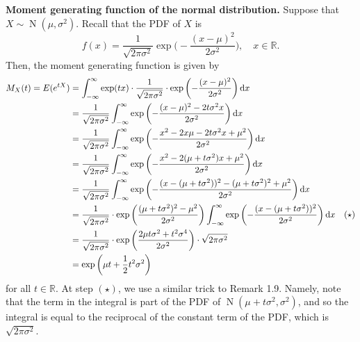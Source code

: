 \documentclass[10pt]{article}
\newcommand{\R}{\mathbb{R}}
\DeclareMathOperator{\Nor}{N}
\theoremstyle{newstyle}
\begin{document}
{\bf Moment generating function of the normal distribution.} Suppose that 
$X \sim \Nor(\mu, \sigma^2)$. Recall that the PDF of $X$ is 
\[ f(x) = \frac{1}{\sqrt{2\pi\sigma^2}} \exp \Big(-\frac{(x-\mu)^2}{2\sigma^2} \Big), 
\quad x \in \R. \]
Then, the moment generating function is given by 
\begin{align*}
    M_X(t) = E(e^{tX}) 
    &= \int_{-\infty}^\infty \exp(tx) \cdot \frac{1}{\sqrt{2\pi\sigma^2}} \cdot 
    \exp \left( -\frac{(x-\mu)^2}{2\sigma^2} \right) {\rm d}x \\
    &= \frac{1}{\sqrt{2\pi\sigma^2}} \int_{-\infty}^\infty  
    \exp \left( -\frac{(x-\mu)^2 - 2t\sigma^2 x}{2\sigma^2} \right) {\rm d}x \\
    &= \frac{1}{\sqrt{2\pi\sigma^2}} \int_{-\infty}^\infty  
    \exp \left( -\frac{x^2 - 2x\mu - 2t\sigma^2 x + \mu^2}{2\sigma^2} \right) {\rm d}x \\
    &= \frac{1}{\sqrt{2\pi\sigma^2}} \int_{-\infty}^\infty  
    \exp \left( -\frac{x^2 - 2(\mu + t\sigma^2)x + \mu^2}{2\sigma^2} \right) {\rm d}x \\
    &= \frac{1}{\sqrt{2\pi\sigma^2}} \int_{-\infty}^\infty  
    \exp \left( -\frac{(x - (\mu + t\sigma^2))^2 - (\mu + t\sigma^2)^2 + \mu^2}{2\sigma^2} \right) 
    {\rm d}x \\
    &= \frac{1}{\sqrt{2\pi\sigma^2}} \cdot \exp\left( \frac{(\mu+t\sigma^2)^2 - \mu^2}{2\sigma^2}
    \right) \int_{-\infty}^\infty  
    \exp \left( -\frac{(x - (\mu + t\sigma^2))^2}{2\sigma^2} \right) {\rm d}x & (\star) \\
    &= \frac{1}{\sqrt{2\pi\sigma^2}} \cdot \exp\left( \frac{2\mu t\sigma^2 + t^2 \sigma^4}{2\sigma^2}
    \right) \cdot \sqrt{2\pi\sigma^2} \\
    &= \exp \left( \mu t + \frac12 t^2 \sigma^2 \right)
\end{align*}
for all $t \in \R$. At step $(\star)$, we use a similar trick to Remark 1.9. 
Namely, note that the term in the integral is part of the PDF of 
$\Nor(\mu + t\sigma^2, \sigma^2)$, and so the integral is equal to the reciprocal of the constant 
term of the PDF, which is $\sqrt{2\pi\sigma^2}$.
\end{document}
